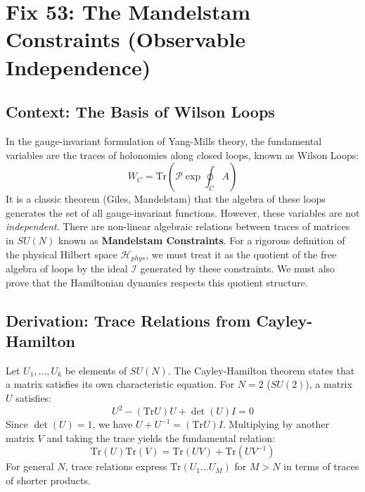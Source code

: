 \chapter{Fix 53: The Mandelstam Constraints (Observable Independence)}
\label{ch:fix53_mandelstam_constraints}

\section{Context: The Basis of Wilson Loops}
In the gauge-invariant formulation of Yang-Mills theory, the fundamental variables are the traces of holonomies along closed loops, known as Wilson Loops:
\begin{equation}
W_C = \text{Tr}\left( \mathcal{P} \exp \oint_C A \right)
\end{equation}
It is a classic theorem (Giles, Mandelstam) that the algebra of these loops generates the set of all gauge-invariant functions. However, these variables are not \textit{independent}. There are non-linear algebraic relations between traces of matrices in $SU(N)$ known as \textbf{Mandelstam Constraints}.
For a rigorous definition of the physical Hilbert space $\mathcal{H}_{phys}$, we must treat it as the quotient of the free algebra of loops by the ideal $\mathcal{I}$ generated by these constraints. We must also prove that the Hamiltonian dynamics respects this quotient structure.

\section{Derivation: Trace Relations from Cayley-Hamilton}
Let $U_1, \dots, U_k$ be elements of $SU(N)$. The Cayley-Hamilton theorem states that a matrix satisfies its own characteristic equation. For $N=2$ ($SU(2)$), a matrix $U$ satisfies:
\begin{equation}
U^2 - (\text{Tr} U) U + \det(U) I = 0
\end{equation}
Since $\det(U) = 1$, we have $U + U^{-1} = (\text{Tr} U) I$. Multiplying by another matrix $V$ and taking the trace yields the fundamental relation:
\begin{equation}
\text{Tr}(U) \text{Tr}(V) = \text{Tr}(UV) + \text{Tr}(UV^{-1})
\end{equation}
For general $N$, trace relations express $\text{Tr}(U_1 \dots U_M)$ for $M > N$ in terms of traces of shorter products.

